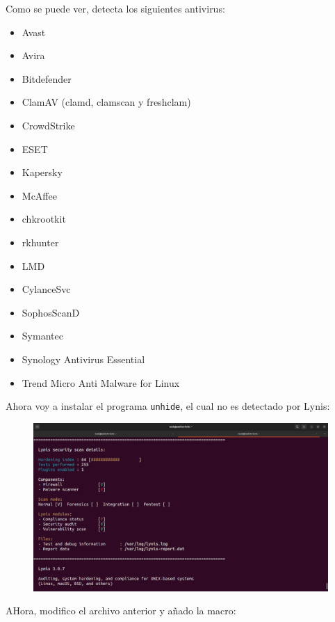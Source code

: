\documentclass{article}
\begin{document}
Como se puede ver, detecta los siguientes antivirus: 

\begin{itemize}
    \item Avast
    \item Avira
    \item Bitdefender
    \item ClamAV (clamd, clamscan y freshclam)
    \item CrowdStrike
    \item ESET
    \item Kapersky
    \item McAffee
    \item chkrootkit
    \item rkhunter
    \item LMD
    \item CylanceSvc
    \item SophosScanD
    \item Symantec
    \item Synology Antivirus Essential
    \item Trend Micro Anti Malware for Linux
\end{itemize}

Ahora voy a instalar el programa \verb|unhide|, el cual no es detectado por Lynis:

\begin{figure}[H]
    \includegraphics[width=\textwidth]{imagenes/lynisresults3unhide.png}
\end{figure}

AHora, modifico el archivo anterior y añado la macro:
\end{document}
